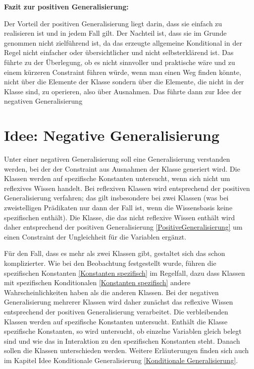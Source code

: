 \documentclass[a4paper, 11pt]{book}
\begin{document}
\textbf{{\large Fazit zur positiven Generalisierung:}}\label{Fazit pos Gen} 

\noindent
Der Vorteil der positiven Generalisierung liegt darin, dass sie einfach zu realisieren ist und in jedem Fall gilt. Der Nachteil ist, dass sie im Grunde genommen nicht zielführend ist, da das erzeugte allgemeine Konditional in der Regel nicht einfacher oder übersichtlicher und nicht selbsterklärend ist. Das führte zu der Überlegung, ob es nicht sinnvoller und praktische wäre und zu einem kürzeren Constraint führen würde, wenn man einen Weg finden könnte, nicht über die Elemente der Klasse sondern über die Elemente, die nicht in der Klasse sind, zu operieren,  also über Ausnahmen. Das führte dann zur Idee der negativen Generalisierung 

\section{Idee: Negative Generalisierung}
\label{NegativeGeneralisierung}
Unter einer negativen Generalisierung soll eine Generalisierung verstanden werden, bei der der Constraint aus Ausnahmen der Klasse generiert wird. Die Klassen werden auf spezifische Konstanten untersucht, wenn sich nicht um reflexives Wissen handelt. Bei reflexiven Klassen wird entsprechend der positiven Generalisierung verfahren; das gilt insbesondere bei zwei Klassen (was bei zweistelligen Prädikaten nur dann der Fall ist, wenn die Wissensbasis keine spezifischen enthält). Die Klasse, die das nicht reflexive Wissen enthält wird daher entsprechend der positiven Generalisierung \ref{PositiveGeneralisierung} um einen Constraint der Ungleichheit für die Variablen ergänzt.


Für den Fall, dass es mehr als zwei Klassen gibt, gestaltet sich das schon komplizierter. Wie bei den Beobachtung festgestellt wurde, führen die spezifischen Konstanten \ref{Konstanten spezifisch} im Regelfall, dazu dass Klassen mit spezifischen Konditionalen \ref{Konstanten spezifisch} andere Wahrscheinlichkeiten haben als die anderen Klassen. Bei der negativen Generalisierung mehrerer Klassen wird daher zunächst das reflexive Wissen entsprechend der positiven Generalisierung verarbeitet. Die verbleibenden Klassen werden auf spezifische Konstanten untersucht. Enthält die Klasse spezifische Konstanten, so wird untersucht, ob einzelne Variablen gleich belegt sind und wie das in Interaktion zu den spezifischen Konstanten steht. Danach sollen die Klassen unterschieden werden. Weitere Erläuterungen finden sich auch im Kapitel Idee Konditionale Generalisierung \ref{Konditionale Generalisierung}. 
\end{document}
